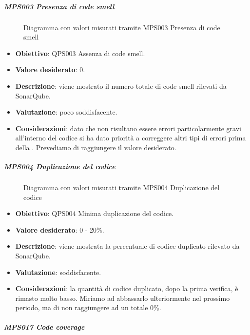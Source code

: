 	\subparagraph{MPS003 Presenza di code smell}
	
	\begin{figure}[H]
		\centering
		\label{immaginePresenzaCodeSmellRQ}
		\caption{Diagramma con valori misurati tramite MPS003 Presenza di code smell}
	\end{figure}
	
	\begin{itemize}
		\item \textbf{Obiettivo}: QPS003 Assenza di code smell.
		\item \textbf{Valore desiderato}: 0.
		\item \textbf{Descrizione}: viene mostrato il numero totale di code smell rilevati da SonarQube.
		\item \textbf{Valutazione}: poco soddisfacente.
		\item \textbf{Considerazioni}: dato che non risultano essere errori particolarmente gravi all'interno del codice si ha dato priorità a correggere altri tipi di errori prima della \RQ. Prevediamo di raggiungere il valore
		desiderato.
	\end{itemize}
	
	\subparagraph{MPS004 Duplicazione del codice}
	
	\begin{figure}[H]
		\centering
		\label{immaginePresenzaDupplicazioneCodiceRQ}
		\caption{Diagramma con valori misurati tramite MPS004 Duplicazione del codice}
	\end{figure}
	
	\begin{itemize}
		\item \textbf{Obiettivo}: QPS004 Minima duplicazione del codice.
		\item \textbf{Valore desiderato}: 0 - 20\%.
		\item \textbf{Descrizione}: viene mostrata la percentuale di codice duplicato rilevato da SonarQube.
		\item \textbf{Valutazione}: soddisfacente.
		\item \textbf{Considerazioni}: la quantità di codice duplicato, dopo la prima verifica, è rimasto molto basso. Miriamo ad abbassarlo ulteriormente nel prossimo periodo, ma di non raggiungere ad un totale 0\%.
	\end{itemize}

	\subparagraph{MPS017 Code coverage}
	
